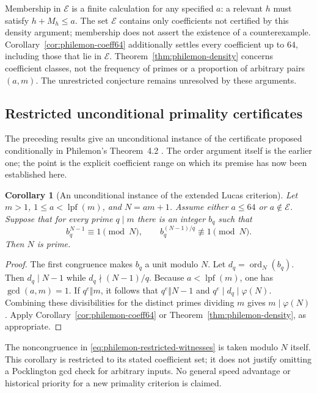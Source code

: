 \documentclass[11pt,a4paper]{article}
\newtheorem{corollary}[theorem]{Corollary}
\theoremstyle{definition}\newtheorem{definition}[theorem]{Definition}
\theoremstyle{remark}\newtheorem{remark}[theorem]{Remark}
\begin{document}
Membership in $\mathcal E$ is a finite calculation for any specified
$a$: a relevant $h$ must satisfy $h+M_h\leq a$.  The set
$\mathcal E$ contains only coefficients not certified by this density
argument; membership does not assert the existence of a counterexample.
Corollary~\ref{cor:philemon-coeff64} additionally settles every
coefficient up to $64$, including those that lie in $\mathcal E$.
Theorem~\ref{thm:philemon-density} concerns coefficient classes, not
the frequency of primes or a proportion of arbitrary pairs $(a,m)$.
The unrestricted conjecture remains unresolved by these arguments.

\subsection{Restricted unconditional primality certificates}
\label{sec:philemon-restricted-certificate}

The preceding results give an unconditional instance of the certificate
proposed conditionally in Philemon's Theorem~4.2
\cite{philemon2021}.  The order argument itself is the earlier one;
the point is the explicit coefficient range on which its premise has
now been established here.

\begin{corollary}[An unconditional instance of the extended Lucas criterion]
\label{cor:philemon-restricted-certificate}
Let $m>1$, $1\leq a<\operatorname{lpf}(m)$, and $N=am+1$.
Assume either $a\leq64$ or $a\notin\mathcal E$.
Suppose that for every prime $q\mid m$ there is an integer $b_q$
such that
\begin{equation}\label{eq:philemon-restricted-witnesses}
 b_q^{N-1}\equiv1\pmod N,
 \qquad
 b_q^{(N-1)/q}\not\equiv1\pmod N.
\end{equation}
Then $N$ is prime.
\end{corollary}

\begin{proof}
The first congruence makes $b_q$ a unit modulo $N$.
Let $d_q=\operatorname{ord}_N(b_q)$.
Then $d_q\mid N-1$ while $d_q\nmid(N-1)/q$.
Because $a<\operatorname{lpf}(m)$, one has $\gcd(a,m)=1$.
If $q^e\Vert m$, it follows that $q^e\Vert N-1$ and
$q^e\mid d_q\mid\varphi(N)$.  Combining these divisibilities
for the distinct primes dividing $m$ gives $m\mid\varphi(N)$.
Apply Corollary~\ref{cor:philemon-coeff64} or
Theorem~\ref{thm:philemon-density}, as appropriate.
\end{proof}

The noncongruence in \eqref{eq:philemon-restricted-witnesses} is taken
modulo $N$ itself.  This corollary is restricted to its stated
coefficient set; it does not justify omitting a Pocklington gcd check
for arbitrary inputs.  No general speed advantage or historical
priority for a new primality criterion is claimed.
\end{document}
